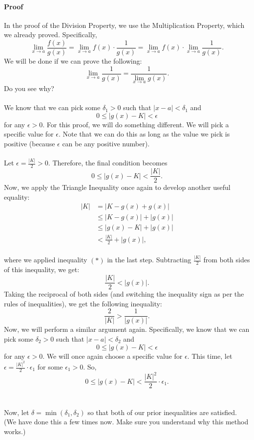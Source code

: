 \documentclass{article}
\begin{document}
\paragraph{Proof} In the proof of the Division Property, we use the Multiplication Property, which we already proved. Specifically,
\[\lim_{x\to a}\frac{f(x)}{g(x)}=\lim_{x\to a}f(x)\cdot \frac{1}{g(x)}=\lim_{x\to a}f(x)\cdot \lim_{x\to a} \frac{1}{g(x)}.\]
We will be done if we can prove the following:
\[\lim_{x\to a} \frac{1}{g(x)} = \frac{1}{\lim_{x\to a} g(x)}.\]
Do you see why? 
\\
\\
We know that we can pick some $\delta_1>0$ such that $|x-a|<\delta_1$ and 
\[0\leq |g(x)-K|<\epsilon\]
for any $\epsilon>0$. For this proof, we will do something different. We will pick a specific value for $\epsilon$. Note that we can do this as long as the value we pick is positive (because $\epsilon$ can be any positive number). 
\\
\\
Let $\epsilon=\frac{|K|}{2}>0$. Therefore, the final condition becomes 
\[0\leq |g(x)-K|<\frac{|K|}{2}.\tag{$*$}\]
Now, we apply the Triangle Inequality once again to develop another useful equality:
\begin{align*}
    |K| &= |K-g(x)+g(x)|\\
    &\leq |K-g(x)| + |g(x)|\\
    &\leq |g(x)-K| + |g(x)|\\
    &< \frac{|K|}{2} + |g(x)|,
\end{align*}
\\
where we applied inequality $(*)$ in the last step. Subtracting $\frac{|K|}{2}$ from both sides of this inequality, we get:
\[\frac{|K|}{2}<|g(x)|.\]
Taking the reciprocal of both sides (and switching the inequality sign as per the rules of inequalities), we get the following inequality:
\[\frac{2}{|K|}>\frac{1}{|g(x)|}.\tag{$\triangle$}\]
Now, we will perform a similar argument again. Specifically, we know that we can pick some $\delta_2>0$ such that $|x-a|<\delta_2$ and 
\[0\leq |g(x)-K|<\epsilon\]
for any $\epsilon>0$. We will once again choose a specific value for $\epsilon$. This time, let $\epsilon=\frac{|K|^2}{2}\cdot \epsilon_1$ for some $\epsilon_1>0$. So, 
\[0\leq |g(x)-K|<\frac{|K|^2}{2}\cdot \epsilon_1.\tag{$\diamond$}\]
\\
\\
Now, let $\delta=\min(\delta_1,\delta_2)$ so that both of our prior inequalities are satisfied. (We have done this a few times now. Make sure you understand why this method works.) 
\end{document}
